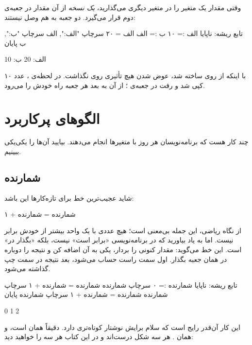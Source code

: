 وقتی مقدار یک متغیر را در متغیر دیگری می‌گذارید، \emph{یک نسخه} از آن مقدار
در جعبه‌ی دوم قرار می‌گیرد. دو جعبه به هم وصل نیستند:

\begin{salamfa}
تابع ریشه:
    ناپایا الف := ۱۰
    ب := الف
    الف = ۲۰
    سرچاپ "الف:", الف
    سرچاپ "ب:", ب
پایان
\end{salamfa}

\begin{outputfa}
الف: 20
ب: 10
\end{outputfa}

با اینکه  از روی  ساخته شد، عوض شدن  هیچ
تأثیری روی  نگذاشت. در لحظه‌ی ، عدد ۱۰ کپی
شد و رفت در جعبه‌ی ؛ از آن به بعد هر جعبه راه خودش را می‌رود.

\section{الگوهای پرکاربرد}

چند کار هست که برنامه‌نویسان هر روز با متغیرها انجام می‌دهند. بیایید آن‌ها
را یکی‌یکی ببینیم.

\subsection{شمارنده}

شاید عجیب‌ترین خط برای تازه‌کارها این باشد:

\begin{salamfa}
شمارنده = شمارنده + ۱
\end{salamfa}

از نگاه ریاضی، این جمله بی‌معنی است؛ هیچ عددی با یک واحد بیشتر از خودش
برابر نیست. اما به یاد بیاورید که \code{=} در برنامه‌نویسی «برابر است» نیست،
بلکه «بگذار در» است. این خط می‌گوید: مقدار کنونی  را بردار،
یکی به آن اضافه کن و نتیجه را دوباره در همان جعبه بگذار. اول سمت راست
حساب می‌شود، بعد نتیجه در سمت چپ گذاشته می‌شود.

\begin{salamfa}
تابع ریشه:
    ناپایا شمارنده := ۰
    سرچاپ شمارنده
    شمارنده = شمارنده + ۱
    سرچاپ شمارنده
    شمارنده = شمارنده + ۱
    سرچاپ شمارنده
پایان
\end{salamfa}

\begin{outputfa}
0
1
2
\end{outputfa}

این کار آن‌قدر رایج است که سلام برایش نوشتار کوتاه‌تری دارد.
 دقیقاً همان 
است، و  همان . هر سه شکل
درست‌اند و در این کتاب هر سه را خواهید دید:

